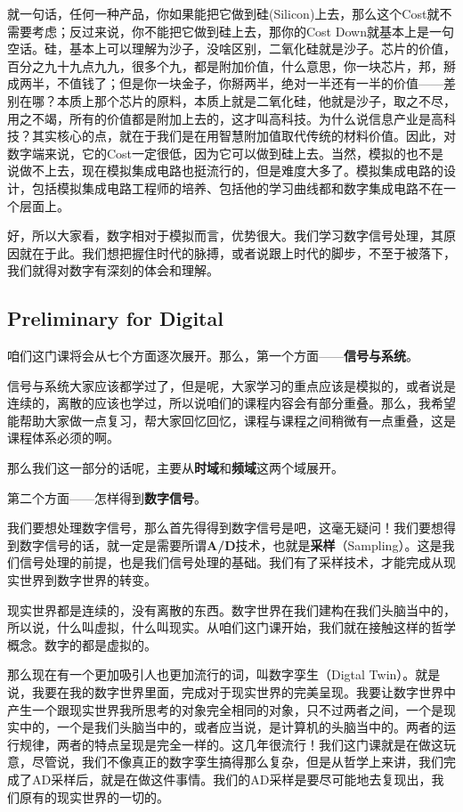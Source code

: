 \documentclass[a4paper,12pt]{article}
\begin{document}
就一句话，任何一种产品，你如果能把它做到硅(Silicon)上去，那么这个Cost就不需要考虑；反过来说，你不能把它做到硅上去，那你的Cost Down就基本上是一句空话。硅，基本上可以理解为沙子，没啥区别，二氧化硅就是沙子。芯片的价值，百分之九十九点九九，很多个九，都是附加价值，什么意思，你一块芯片，邦，掰成两半，不值钱了；但是你一块金子，你掰两半，绝对一半还有一半的价值——差别在哪？本质上那个芯片的原料，本质上就是二氧化硅，他就是沙子，取之不尽，用之不竭，所有的价值都是附加上去的，这才叫高科技。为什么说信息产业是高科技？其实核心的点，就在于我们是在用智慧附加值取代传统的材料价值。因此，对数字端来说，它的Cost一定很低，因为它可以做到硅上去。当然，模拟的也不是说做不上去，现在模拟集成电路也挺流行的，但是难度大多了。模拟集成电路的设计，包括模拟集成电路工程师的培养、包括他的学习曲线都和数字集成电路不在一个层面上。


好，所以大家看，数字相对于模拟而言，优势很大。我们学习数字信号处理，其原因就在于此。我们想把握住时代的脉搏，或者说跟上时代的脚步，不至于被落下，我们就得对数字有深刻的体会和理解。


\subsection{Preliminary for Digital}\quad

咱们这门课将会从七个方面逐次展开。那么，第一个方面——\textbf{信号与系统}。


信号与系统大家应该都学过了，但是呢，大家学习的重点应该是模拟的，或者说是连续的，离散的应该也学过，所以说咱们的课程内容会有部分重叠。那么，我希望能帮助大家做一点复习，帮大家回忆回忆，课程与课程之间稍微有一点重叠，这是课程体系必须的啊。

那么我们这一部分的话呢，主要从\textbf{时域}和\textbf{频域}这两个域展开。


第二个方面——怎样得到\textbf{数字信号}。

我们要想处理数字信号，那么首先得得到数字信号是吧，这毫无疑问！我们要想得到数字信号的话，就一定是需要所谓\textbf{A/D}技术，也就是\textbf{采样}（Sampling）。这是我们信号处理的前提，也是我们信号处理的基础。我们有了采样技术，才能完成从现实世界到数字世界的转变。


现实世界都是连续的，没有离散的东西。数字世界在我们建构在我们头脑当中的，所以说，什么叫虚拟，什么叫现实。从咱们这门课开始，我们就在接触这样的哲学概念。数字的都是虚拟的。

那么现在有一个更加吸引人也更加流行的词，叫数字孪生（Digtal Twin）。就是说，我要在我的数字世界里面，完成对于现实世界的完美呈现。我要让数字世界中产生一个跟现实世界我所思考的对象完全相同的对象，只不过两者之间，一个是现实中的，一个是我们头脑当中的，或者应当说，是计算机的头脑当中的。两者的运行规律，两者的特点呈现是完全一样的。这几年很流行！我们这门课就是在做这玩意，尽管说，我们不像真正的数字孪生搞得那么复杂，但是从哲学上来讲，我们完成了AD采样后，就是在做这件事情。我们的AD采样是要尽可能地去复现出，我们原有的现实世界的一切的。
\end{document}
